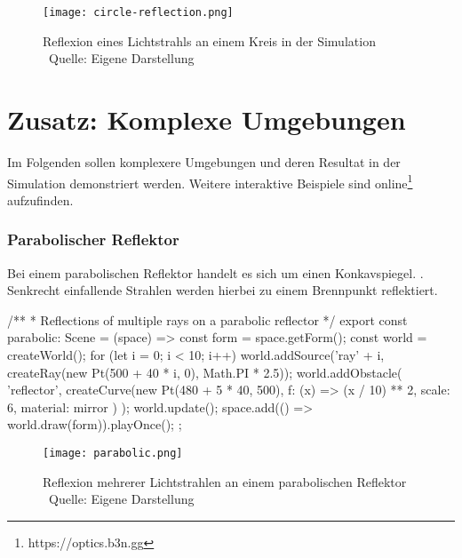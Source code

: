 
\begin{figure}
    \centering
    \texttt{[image: circle-reflection.png]}

    \caption{Reflexion eines Lichtstrahls an einem Kreis in der Simulation  \\ Quelle: Eigene Darstellung}

\end{figure}

\chapter*{Zusatz: Komplexe Umgebungen}
Im Folgenden sollen komplexere Umgebungen und deren Resultat in der Simulation demonstriert werden. 
Weitere interaktive Beispiele sind online\footnote{https://optics.b3n.gg} aufzufinden.
\subsection*{Parabolischer Reflektor}
Bei einem parabolischen Reflektor handelt es sich um einen Konkavspiegel. \parencite[vgl.][S. 362]{kuchling2004taschenbuch}.
Senkrecht einfallende Strahlen werden hierbei zu einem Brennpunkt reflektiert. 

\begin{verbnobox}[\scriptsize\mbox{}]
/**
* Reflections of multiple rays on a parabolic reflector
*/
export const parabolic: Scene = (space) => {
    const form = space.getForm();
    const world = createWorld();
    for (let i = 0; i < 10; i++) {
        world.addSource('ray' + i, createRay(new Pt(500 + 40 * i, 0), Math.PI * 2.5));
    }
    world.addObstacle(
        'reflector',
        createCurve(new Pt(480 + 5 * 40, 500), { f: (x) => (x / 10) ** 2, scale: 6, material: mirror })
    );
    world.update();
    space.add(() => world.draw(form)).playOnce();
};
\end{verbnobox}

\begin{figure}
    \centering
    \texttt{[image: parabolic.png]}

    \caption{Reflexion mehrerer Lichtstrahlen an einem parabolischen Reflektor  \\ Quelle: Eigene Darstellung}

\end{figure}
\newpage

